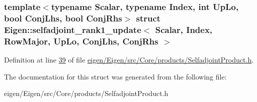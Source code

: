 \subsubsection*{template$<$typename Scalar, typename Index, int Up\+Lo, bool Conj\+Lhs, bool Conj\+Rhs$>$\newline
struct Eigen\+::selfadjoint\+\_\+rank1\+\_\+update$<$ Scalar, Index, Row\+Major, Up\+Lo, Conj\+Lhs, Conj\+Rhs $>$}



Definition at line \hyperlink{eigen_2_eigen_2src_2_core_2products_2_selfadjoint_product_8h_source_l00039}{39} of file \hyperlink{eigen_2_eigen_2src_2_core_2products_2_selfadjoint_product_8h_source}{eigen/\+Eigen/src/\+Core/products/\+Selfadjoint\+Product.\+h}.



The documentation for this struct was generated from the following file\+:\begin{DoxyCompactItemize}
\item 
eigen/\+Eigen/src/\+Core/products/\+Selfadjoint\+Product.\+h\end{DoxyCompactItemize}
